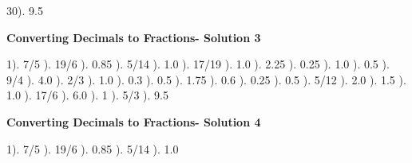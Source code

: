 \documentclass{article}%
\begin{document}
30). 9.5%
\newline%
\newpage%
\large%
\begin{center}%
\textbf{Converting Decimals to Fractions- Solution 3}%
\newline%
\end{center} \normalsize%
1). 7/5%
). 19/6%
). 0.85%
). 5/14%
). 1.0%
). 17/19%
). 1.0%
). 2.25%
). 0.25%
). 1.0%
). 0.5%
). 9/4%
). 4.0%
). 2/3%
). 1.0%
). 0.3%
). 0.5%
). 1.75%
). 0.6%
). 0.25%
). 0.5%
). 5/12%
). 2.0%
). 1.5%
). 1.0%
). 17/6%
). 6.0%
). 1%
). 5/3%
). 9.5%
\newline%
\newpage%
\large%
\begin{center}%
\textbf{Converting Decimals to Fractions- Solution 4}%
\newline%
\end{center} \normalsize%
1). 7/5%
). 19/6%
). 0.85%
). 5/14%
). 1.0%
\newline%
\end{document}
